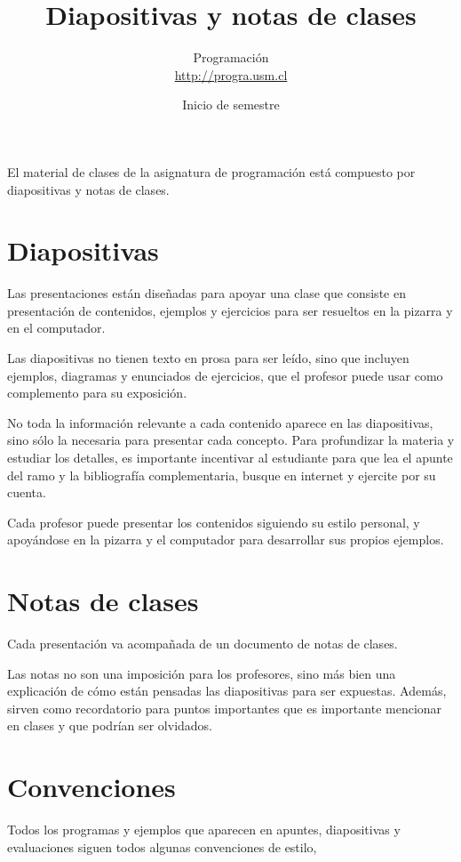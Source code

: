 \documentclass[12pt,spanish]{article}
\title{Diapositivas y notas de clases}
\author{Programación \\ \url{http://progra.usm.cl}}
\date{Inicio de semestre}
\begin{document}
  \maketitle

  El material de clases de la asignatura de programación
  está compuesto por diapositivas y notas de clases.

  \section*{Diapositivas}

  Las presentaciones están diseñadas para apoyar una clase
  que consiste en presentación de contenidos,
  ejemplos y ejercicios para ser resueltos
  en la pizarra y en el computador.

  Las diapositivas no tienen texto en prosa para ser leído,
  sino que incluyen ejemplos, diagramas y enunciados de ejercicios,
  que el profesor puede usar como complemento para su exposición.

  No toda la información relevante a cada contenido
  aparece en las diapositivas,
  sino sólo la necesaria para presentar cada concepto.
  Para profundizar la materia y estudiar los detalles,
  es importante incentivar al estudiante
  para que lea el apunte del ramo y la bibliografía complementaria,
  busque en internet y ejercite por su cuenta.

  Cada profesor puede presentar los contenidos
  siguiendo su estilo personal,
  y apoyándose en la pizarra y el computador
  para desarrollar sus propios ejemplos.

  \section*{Notas de clases}
  Cada presentación va acompañada de un documento de notas de clases.

  Las notas no son una imposición para los profesores,
  sino más bien una explicación
  de cómo están pensadas las diapositivas para ser expuestas.
  Además, sirven como recordatorio para puntos importantes
  que es importante mencionar en clases
  y que podrían ser olvidados.

  \section*{Convenciones}

  Todos los programas y ejemplos que aparecen
  en apuntes, diapositivas y evaluaciones
  siguen todos algunas convenciones de estilo,
\end{document}
